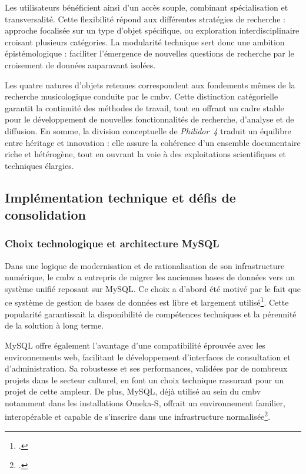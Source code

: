 Les utilisateurs bénéficient ainsi d'un accès souple, combinant spécialisation et transversalité. Cette flexibilité répond aux différentes stratégies de recherche : approche focalisée sur un type d'objet spécifique, ou exploration interdisciplinaire croisant plusieurs catégories. La modularité technique sert donc une ambition épistémologique : faciliter l'émergence de nouvelles questions de recherche par le croisement de données auparavant isolées.

Les quatre natures d'objets retenues correspondent aux fondements mêmes de la recherche musicologique conduite par le \gls{cmbv}. Cette distinction catégorielle garantit la continuité des méthodes de travail, tout en offrant un cadre stable pour le développement de nouvelles fonctionnalités de recherche, d'analyse et de diffusion. En somme, la division conceptuelle de \textit{Philidor~4} traduit un équilibre entre héritage et innovation : elle assure la cohérence d'un ensemble documentaire riche et hétérogène, tout en ouvrant la voie à des exploitations scientifiques et techniques élargies.

\subsection{Implémentation technique et défis de consolidation}

\subsubsection{Choix technologique et architecture MySQL}

Dans une logique de modernisation et de rationalisation de son infrastructure numérique, le \gls{cmbv} a entrepris de migrer les anciennes bases de données vers un système unifié reposant sur MySQL. Ce choix a d'abord été motivé par le fait que ce système de gestion de bases de données est libre et largement utilisé\footcite{laurentguilloRapportMigrationAnciennes2022}. Cette popularité garantissait la disponibilité de compétences techniques et la pérennité de la solution à long terme.

MySQL offre également l'avantage d'une compatibilité éprouvée avec les environnements web, facilitant le développement d'interfaces de consultation et d'administration. Sa robustesse et ses performances, validées par de nombreux projets dans le secteur culturel, en font un choix technique rassurant pour un projet de cette ampleur. De plus, MySQL, déjà utilisé au sein du \gls{cmbv} notamment dans les installations Omeka-S, offrait un environnement familier, interopérable et capable de s'inscrire dans une infrastructure normalisée\footcite{laurentguilloRapportMigrationAnciennes2022}.


